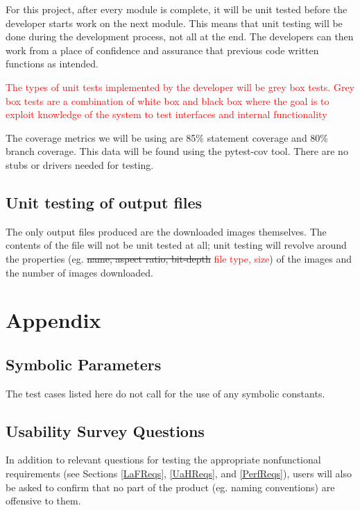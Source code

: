 \documentclass[12pt, titlepage]{article}
\begin{document}
For this project, after every module is complete, it will be unit tested before the developer starts work on the next module. This means that unit testing will be done during the development process, not all at the end. The developers can then work from a place of confidence and assurance that previous code written functions as intended.

\textcolor{red}{The types of unit tests implemented by the developer will be grey box tests. Grey box tests are a
combination of white box and black box where the goal is to exploit knowledge of the system to test interfaces and 
internal functionality}

The coverage metrics we will be using are 85\% statement coverage and 80\% branch coverage. This data will be found using the pytest-cov tool. There are no stubs or drivers needed for testing.
		
\subsection{Unit testing of output files}

The only output files produced are the downloaded images themselves. The contents of the file will not be unit 
tested at all; unit testing will revolve around the properties (eg. \sout{name, aspect ratio, bit-depth} \textcolor{red}{
file type, size}) of the images and the number of images downloaded.

%

%

\newpage

\section{Appendix}

\subsection{Symbolic Parameters}

The test cases listed here do not call for the use of any symbolic constants.

\subsection{Usability Survey Questions}

In addition to relevant questions for testing the appropriate nonfunctional requirements (see Sections \ref{LaFReqs}, \ref{UaHReqs}, and \ref{PerfReqs}), users will also be asked to confirm that no part of the product (eg. naming conventions) are offensive to them.
\end{document}
